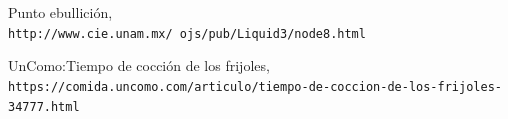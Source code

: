 \documentclass[]{article}
\begin{document}
\begin{thebibliography}{9}
	
	
	
	 Punto ebullición,
	\\\texttt{http://www.cie.unam.mx/~ojs/pub/Liquid3/node8.html}
	
	
   UnComo:Tiempo de cocción de los frijoles,
	\\\texttt{https://comida.uncomo.com/articulo/tiempo-de-coccion-de-los-frijoles-34777.html}
\end{thebibliography}
\end{document}
